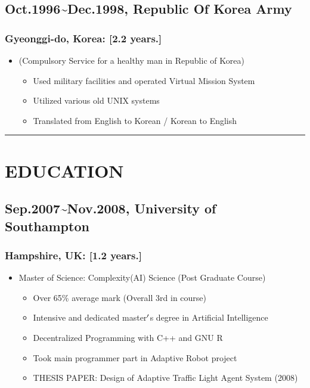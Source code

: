 \documentclass[12pt,a4paper]{article}
\begin{document}
\subsection{Oct.1996{\textasciitilde}Dec.1998, Republic Of Korea Army}
\subsubsection{Gyeonggi-do, Korea: [2.2 years.]}
\begin{itemize}
\item (Compulsory Service for a healthy man in Republic of Korea)

\begin{itemize}
\item Used military facilities and operated Virtual Mission System


\item Utilized various old UNIX systems


\item Translated from English to Korean / Korean to English

\end{itemize}
\end{itemize}
\rule{\textwidth}{1pt}
\section{EDUCATION}
\subsection{Sep.2007{\textasciitilde}Nov.2008, University of Southampton}
\subsubsection{Hampshire, UK: [1.2 years.]}
\begin{itemize}
\item Master of Science: Complexity(AI) Science (Post Graduate Course)

\begin{itemize}
\item Over 65\% average mark (Overall 3rd in course)


\item Intensive and dedicated master\ensuremath{\rq}s degree in Artificial Intelligence


\item Decentralized Programming with C++ and GNU R


\item Took main programmer part in Adaptive Robot project


\item THESIS PAPER: Design of Adaptive Traffic Light Agent System (2008)

\end{itemize}
\end{itemize}
\end{document}
